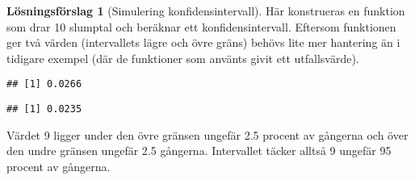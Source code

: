 \documentclass[
]{book}
\newenvironment{Shaded}{\begin{snugshade}}{\end{snugshade}}
\newcommand{\AttributeTok}[1]{\textcolor[rgb]{0.77,0.63,0.00}{#1}}
\newcommand{\CommentTok}[1]{\textcolor[rgb]{0.56,0.35,0.01}{\textit{#1}}}
\newcommand{\ControlFlowTok}[1]{\textcolor[rgb]{0.13,0.29,0.53}{\textbf{#1}}}
\newcommand{\DecValTok}[1]{\textcolor[rgb]{0.00,0.00,0.81}{#1}}
\newcommand{\FunctionTok}[1]{\textcolor[rgb]{0.00,0.00,0.00}{#1}}
\newcommand{\NormalTok}[1]{#1}
\newcommand{\OtherTok}[1]{\textcolor[rgb]{0.56,0.35,0.01}{#1}}
\newcommand{\SpecialCharTok}[1]{\textcolor[rgb]{0.00,0.00,0.00}{#1}}
\newcommand{\StringTok}[1]{\textcolor[rgb]{0.31,0.60,0.02}{#1}}
\theoremstyle{definition}
\theoremstyle{definition}
\theoremstyle{definition}
\theoremstyle{definition}
\newtheorem{hypothesis}{Lösningsförslag}[chapter]
\theoremstyle{remark}
\begin{document}
\begin{hypothesis}[Simulering konfidensintervall]
Här konstrueras en funktion som drar 10 slumptal och beräknar ett konfidensintervall. Eftersom funktionen ger två värden (intervallets lägre och övre gräns) behövs lite mer hantering än i tidigare exempel (där de funktioner som använts givit ett utfallsvärde).

\begin{Shaded}
\end{Shaded}

\begin{verbatim}
## [1] 0.0266
\end{verbatim}

\begin{Shaded}
\end{Shaded}

\begin{verbatim}
## [1] 0.0235
\end{verbatim}

Värdet 9 ligger under den övre gränsen ungefär 2.5 procent av gångerna och över den undre gränsen ungefär 2.5 gångerna. Intervallet täcker alltså 9 ungefär 95 procent av gångerna.


\end{hypothesis}
\end{document}
